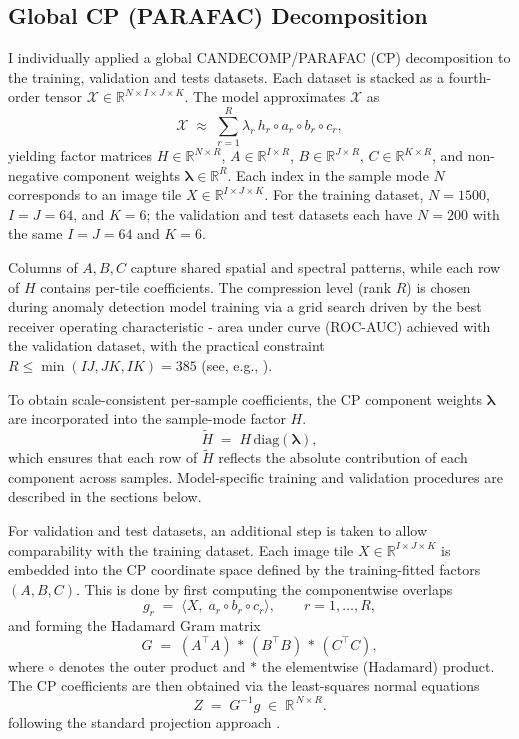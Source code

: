 \documentclass[pdflatex,sn-mathphys-ay]{sn-jnl}
\begin{document}
\subsection{Global CP (PARAFAC) Decomposition}

I individually applied a global CANDECOMP/PARAFAC (CP) decomposition to the training, validation and tests datasets. Each dataset is
stacked as a fourth-order tensor \(\mathcal{X}\in\mathbb{R}^{N\times I\times J\times K}\). The model approximates \(\mathcal{X}\) as
\[
\mathcal{X} \;\approx\; \sum_{r=1}^{R}\lambda_r \, h_r \!\circ a_r \!\circ b_r \!\circ c_r,
\]
yielding factor matrices \(H\in\mathbb{R}^{N\times R}\),
\(A\in\mathbb{R}^{I\times R}\), \(B\in\mathbb{R}^{J\times R}\),
\(C\in\mathbb{R}^{K\times R}\), and non-negative component weights
\(\boldsymbol{\lambda}\in\mathbb{R}^{R}\).
Each index in the sample mode \(N\) corresponds to an image tile \(X\in\mathbb{R}^{I\times J\times K}\).
For the training dataset, \(N=1500\), \(I=J=64\), and \(K=6\); the validation and test datasets each have \(N=200\) with the same \(I=J=64\) and \(K=6\).

Columns of \(A,B,C\) capture shared spatial and spectral patterns,
while each row of \(H\) contains per-tile coefficients.
The compression level (rank \(R\)) is chosen during anomaly detection model training via a grid search driven by the best receiver operating characteristic - area under curve (ROC-AUC) achieved with the validation dataset,
with the practical constraint \(R\le \min(IJ,JK,IK)=385\)
(see, e.g., \citep{KoldaBader2009,Bro1997}).

\noindent To obtain scale-consistent per-sample coefficients,
the CP component weights \(\boldsymbol{\lambda}\) are incorporated into the sample-mode factor \(H\).
\[
\tilde H \;=\; H\,\mathrm{diag}(\boldsymbol{\lambda}),
\]
which ensures that each row of \(\tilde H\) reflects the absolute contribution of each component
across samples. Model-specific training and validation
procedures are described in the sections below.

\noindent For validation and test datasets, an additional step is taken to allow comparability with the training dataset. Each image tile \(X\in\mathbb{R}^{I\times J\times K}\)
is embedded into the CP coordinate space defined by the training-fitted factors \((A,B,C)\).
This is done by first computing the componentwise overlaps
\[
g_r \;=\; \big\langle X,\; a_r \circ b_r \circ c_r \big\rangle,
\qquad r=1,\dots,R,
\]
and forming the Hadamard Gram matrix
\[
G \;=\; (A^\top A)\,\ast\,(B^\top B)\,\ast\,(C^\top C),
\]
where \(\circ\) denotes the outer product and \(\ast\) the elementwise (Hadamard) product.
The CP coefficients are then obtained via the least-squares normal equations
\[
Z \;=\; G^{-1} g \;\in\; \mathbb{R}^{\,N \times R}.
\]
following the standard projection approach
\citep{Kiers2000,SorensenBro2009}.
\end{document}
